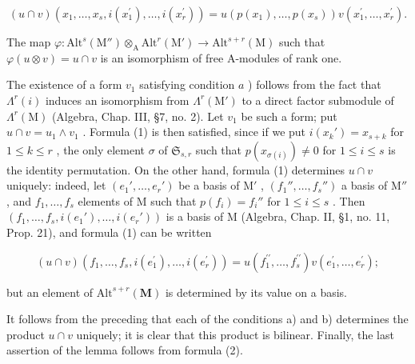 \[
(u \cap v) (x _ {1}, \dots , x _ {s}, i (x _ {1} ^ {\prime}), \dots , i (x _ {r} ^ {\prime})) = u (p (x _ {1}), \dots , p (x _ {s})) v (x _ {1} ^ {\prime}, \dots , x _ {r} ^ {\prime}).\tag{1}
\]

The map \(\varphi : \mathrm{Alt}^s (\mathrm{M}'')\otimes_{\mathrm{A}}\mathrm{Alt}^r (\mathrm{M}')\to \mathrm{Alt}^{s + r}(\mathrm{M})\) such that \(\varphi (u\otimes v) = u\cap v\) is an isomorphism of free A-modules of rank one.

The existence of a form \(v_{1}\) satisfying condition \(a\) ) follows from the fact that \(\Lambda^r (i)\) induces an isomorphism from \(\Lambda^r (\mathrm{M}')\) to a direct factor submodule of \(\Lambda^r (\mathrm{M})\) (Algebra, Chap. III, §7, no. 2). Let \(v_{1}\) be such a form; put \(u\cap v = u_{1}\wedge v_{1}\) . Formula (1) is then satisfied, since if we put \(i(x_k') = x_{s + k}\) for \(1\leq k\leq r\) , the only element \(\sigma\) of \(\mathfrak{S}_{s,r}\) such that \(p(x_{\sigma (i)})\neq 0\) for \(1\leq i\leq s\) is the identity permutation. On the other hand, formula (1) determines \(u\cap v\) uniquely: indeed, let \((e_1',\ldots ,e_r')\) be a basis of \(\mathrm{M}'\) , \((f_1'',\dots,f_s'')\) a basis of \(\mathrm{M}''\) , and \(f_{1},\ldots ,f_{s}\) elements of \(\mathrm{M}\) such that \(p(f_i) = f_i''\) for \(1\leq i\leq s\) . Then \((f_{1},\ldots ,f_{s},i(e_1'),\ldots ,i(e_r'))\) is a basis of \(\mathrm{M}\) (Algebra, Chap. II, §1, no. 11, Prop. 21), and formula (1) can be written

\[
(u \cap v) (f _ {1}, \dots , f _ {s}, i (e _ {1} ^ {\prime}), \dots , i (e _ {r} ^ {\prime})) = u (f _ {1} ^ {\prime \prime}, \dots , f _ {s} ^ {\prime \prime}) v (e _ {1} ^ {\prime}, \dots , e _ {r} ^ {\prime});\tag{2}
\]

but an element of \(\mathrm{Alt}^{s + r}(\mathbf{M})\) is determined by its value on a basis.

It follows from the preceding that each of the conditions a) and b) determines the product \(u \cap v\) uniquely; it is clear that this product is bilinear. Finally, the last assertion of the lemma follows from formula (2).